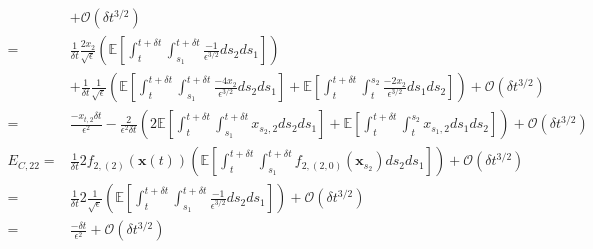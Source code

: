 \begin{equation}
\begin{aligned}
&+ \mathcal{O} (\delta t^{3/2}) \\
=& 
\frac{1}{\delta t} \frac{2 x_2}{\sqrt{\epsilon}} \left( \mathbb{E} \left[ \int_t^{t+\delta t} \int_{s_1}^{t+\delta t} \frac{-1}{\epsilon^{3/2}} ds_2 ds_1 \right]  \right) \\
&+ \frac{1}{\delta t} \frac{1}{\sqrt{\epsilon}} \left( \mathbb{E} \left[ \int_t^{t+\delta t} \int_{s_1}^{t + \delta t} \frac{-4 x_2}{\epsilon^{3/2}} ds_2 ds_1 \right]
+ \mathbb{E} \left[ \int_t^{t+\delta t} \int_t^{s_2} \frac{-2 x_2}{\epsilon^{3/2}} ds_1 ds_2 \right] \right) 
+ \mathcal{O} (\delta t^{3/2}) \\
=& 
 \frac{- x_{t,2} \delta t}{\epsilon^2}
- \frac{2}{\epsilon^2 \delta t} \left( 2 \mathbb{E} \left[ \int_t^{t+\delta t} \int_{s_1}^{t + \delta t} x_{s_2,2} ds_2 ds_1 \right]
+ \mathbb{E} \left[ \int_t^{t+\delta t} \int_t^{s_2} x_{s_1,2} ds_1 ds_2 \right] \right) 
+ \mathcal{O} (\delta t^{3/2}) \\
E_{C, 22} 
=&
 \frac{1}{\delta t} 2 f_{2,(2)}(\mathbf{x}(t)) \left( \mathbb{E} \left[ \int_t^{t+\delta t} \int_{s_1}^{t+\delta t} f_{2,(2,0)}(\mathbf{x}_{s_2}) ds_2 ds_1 \right]  \right) 
+ \mathcal{O} (\delta t^{3/2}) \\
=&
 \frac{1}{\delta t} 2 \frac{1}{\sqrt{\epsilon}} \left( \mathbb{E} \left[ \int_t^{t+\delta t} \int_{s_1}^{t+\delta t} \frac{-1}{\epsilon^{3/2}} ds_2 ds_1 \right]  \right) 
+ \mathcal{O} (\delta t^{3/2})\\
=&
\frac{-\delta t}{\epsilon^2} 
+ \mathcal{O} (\delta t^{3/2})
\end{aligned}
\end{equation}